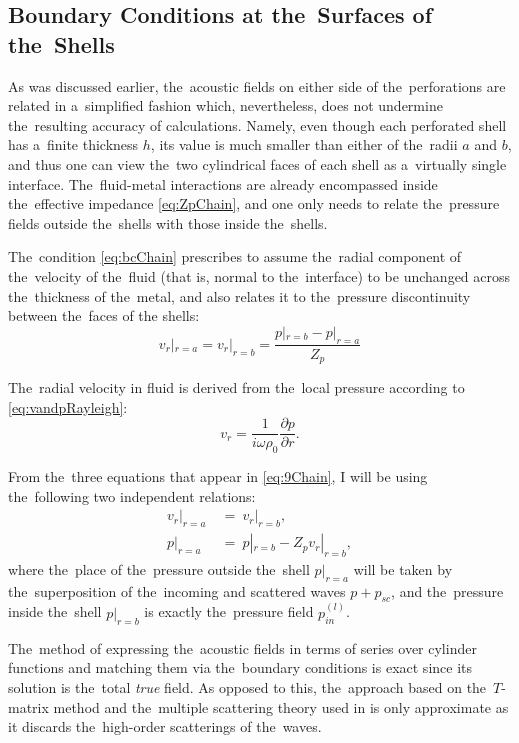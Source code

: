 \subsection{Boundary Conditions at the~Surfaces of the~Shells}

As was discussed earlier, the~acoustic fields on either side of the~perforations are related in a~simplified fashion which, nevertheless, does not undermine the~resulting accuracy of calculations.
Namely, even though each perforated shell has a~finite thickness $h$, its value is much smaller than either of the~radii $a$ and $b$, and thus one can view the~two cylindrical faces of each shell as a~virtually single interface.
The~fluid-metal interactions are already encompassed inside the~effective impedance \cref{eq:ZpChain}, and one only needs to relate the~pressure fields outside the~shells with those inside the~shells.
 
The~condition \cref{eq:bcChain} prescribes to assume the~radial component of the~velocity of the~fluid (that is, normal to the~interface) to be unchanged across the~thickness of the~metal, and also relates it to the~pressure discontinuity between the~faces of the shells:
\begin{equation}
\label{eq:9Chain}
v_r|_{r=a} = v_r|_{r=b} = \dfrac{p|_{r=b} - p|_{r=a}}{Z_p}
\end{equation}

The~radial velocity in fluid is derived from the~local pressure according to \cref{eq:vandpRayleigh}:
\begin{equation}
\label{eq:10Chain}
v_r = \dfrac{1}{i\omega\rho_0}\dfrac{\partial p}{\partial r}.
\end{equation}

From the~three equations that appear in \cref{eq:9Chain}, I will be using the~following two independent relations:
\begin{align}
\label{eq:10aChain}
v_r|_{r=a}~&=~v_r|_{r=b}, \\
p|_{r=a}~&=~p|_{r=b}-Z_p v_r|_{r=b},
\end{align}
where the~place of the~pressure outside the~shell $p|_{r=a}$ will be taken by the~superposition of the~incoming and scattered waves $p+p_{sc}$, and the~pressure inside the~shell $p|_{r=b}$ is exactly the~pressure field $p_{in}^{(l)}$.

The~method of expressing the~acoustic fields in terms of series over cylinder functions and matching them via the~boundary conditions is exact since its solution is the~total \textit{true} field.
As opposed to this, the~approach based on the~$T$-matrix method and the~multiple scattering theory used in \cite{garcia2,garcia1} is only approximate as it discards the~high-order scatterings of the~waves.

